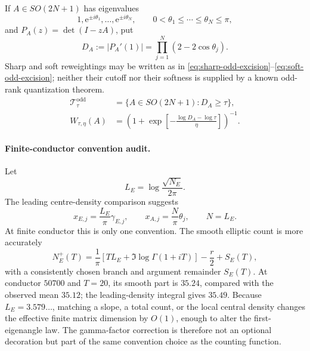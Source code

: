 \documentclass[11pt,reqno]{amsart}
\theoremstyle{remark}
\newcommand{\e}{\mathrm{e}}
\begin{document}
If $A\in SO(2N+1)$ has eigenvalues
\begin{equation}
  1,\e^{\pm i\theta_1},\ldots,\e^{\pm i\theta_N},
  \qquad 0<\theta_1\le\cdots\le\theta_N\le\pi,
\end{equation}
and $P_A(z)=\det(I-zA)$, put
\begin{equation}
  D_A:=|P_A'(1)|
  =\prod_{j=1}^{N}(2-2\cos\theta_j).
  \label{eq:reduced-characteristic-derivative}
\end{equation}
Sharp and soft reweightings may be written as in \eqref{eq:sharp-odd-excision}--\eqref{eq:soft-odd-excision}; neither their cutoff nor their softness is supplied by a known odd-rank quantization theorem.
\begin{align}
  \mathcal T_{\tau}^{\mathrm{odd}}
  &=\{A\in SO(2N+1):D_A\ge\tau\},
  \label{eq:sharp-odd-excision}\\
  W_{\tau,\eta}(A)
  &=\left(1+\exp\left[-\frac{\log D_A-\log\tau}{\eta}\right]\right)^{-1}.
  \label{eq:soft-odd-excision}
\end{align}

\paragraph{Finite-conductor convention audit.}
Let
\begin{equation}
  L_E=\log\frac{\sqrt{N_E}}{2\pi}.
\end{equation}
The leading centre-density comparison suggests
\begin{equation}
  x_{E,j}=\frac{L_E}{\pi}\gamma_{E,j},
  \qquad
  x_{A,j}=\frac{N}{\pi}\theta_j,
  \qquad N=L_E.
  \label{eq:unfolding}
\end{equation}
At finite conductor this is only one convention.  The smooth elliptic count is more accurately
\begin{equation}
  N_E^+(T)
  =\frac1\pi\left[T L_E+\Im\log\Gamma(1+iT)\right]-\frac r2+S_E(T),
  \label{eq:exact-smooth-count}
\end{equation}
with a consistently chosen branch and argument remainder $S_E(T)$.  At conductor $50700$ and $T=20$, its smooth part is $35.24$, compared with the observed mean $35.12$; the leading-density integral gives $35.49$.  Because $L_E=3.579\ldots$, matching a slope, a total count, or the local central density changes the effective finite matrix dimension by $O(1)$, enough to alter the first-eigenangle law.  The gamma-factor correction is therefore not an optional decoration but part of the same convention choice as the counting function.
\end{document}
